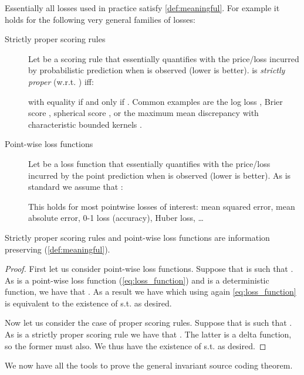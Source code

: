 \documentclass[final]{article}
\begin{document}
Essentially all losses used in practice satisfy \cref{def:meaningful}.
For example it holds for the following very general families of losses:
\begin{description}
\item[Strictly proper scoring rules] Let  be a scoring rule that essentially quantifies with  the price/loss incurred by probabilistic prediction  when  is observed (lower is better).
 is \textit{strictly proper} \cite{gneiting_strictly_2007} (w.r.t. ) iff:

with equality if and only if .
Common examples are the log loss \cite{good_rational_1952}, 
Brier score \cite{brier_verification_1950}, spherical score \cite{good_comment_1971}, or the maximum mean discrepancy with characteristic bounded kernels \cite{sriperumbudur_injective_2008,huszar_scoring_2013}.
\item[Point-wise loss functions] Let  be a loss function that essentially quantifies with  the price/loss incurred by the point prediction  when  is observed (lower is better).
As is standard \cite{gneiting_making_2010} we assume that :

This holds for most pointwise losses of interest: mean squared error, mean absolute error, 0-1 loss (accuracy), Huber loss, \dots 
\end{description}

\begin{lemma}
Strictly proper scoring rules and point-wise loss functions are information preserving (\cref{def:meaningful}).
\end{lemma}
\begin{proof}
First let us consider point-wise loss functions.
Suppose that  is such that .
As  is a point-wise loss function (\cref{eq:loss_function}) and  is a deterministic function, we have that .
As a result we have  which using again \cref{eq:loss_function} is equivalent to the existence of  s.t.    as desired.


Now let us consider the case of proper scoring rules.
Suppose that  is such that .
As  is a strictly proper scoring rule we have that . 
The latter is a delta function, so the former must also. We thus have the existence of  s.t.    as desired.
\end{proof}


We now have all the tools to prove the general invariant source coding theorem.
\end{document}
